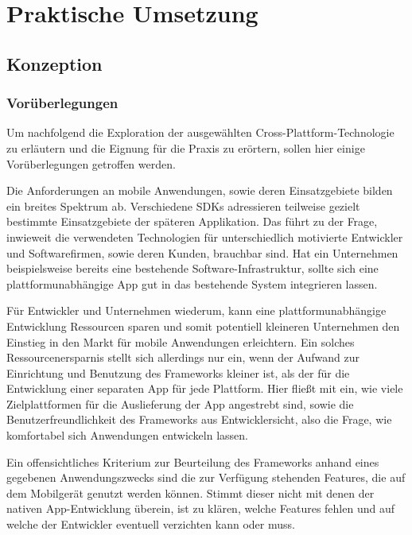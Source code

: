 \part{Praktische Umsetzung} \label{sec:praxis} 

\chapter{Konzeption}	

\section{Vorüberlegungen}	\label{sec:kriterien}
	
 	Um nachfolgend die Exploration der ausgewählten Cross-Plattform-Technologie zu erläutern und die Eignung für die Praxis zu erörtern, sollen hier einige Vorüberlegungen getroffen werden.
 	
 	Die Anforderungen an mobile Anwendungen, sowie deren Einsatzgebiete bilden ein breites Spektrum ab. Verschiedene SDKs adressieren teilweise gezielt bestimmte Einsatzgebiete der späteren Applikation. Das führt zu der Frage, inwieweit die verwendeten Technologien für unterschiedlich motivierte Entwickler und Softwarefirmen, sowie deren Kunden, brauchbar sind. Hat ein Unternehmen beispielsweise bereits eine bestehende Software-Infrastruktur, sollte sich eine plattformunabhängige App gut in das bestehende System integrieren lassen.
 	
 	Für Entwickler und Unternehmen wiederum, kann eine plattformunabhängige Entwicklung Ressourcen sparen und somit potentiell kleineren Unternehmen den Einstieg in den Markt für mobile Anwendungen erleichtern. 
 	Ein solches Ressourcenersparnis stellt sich allerdings nur ein, wenn der Aufwand zur Einrichtung und Benutzung des Frameworks kleiner ist, als der für die Entwicklung einer separaten App für jede Plattform. 
 	Hier fließt mit ein, wie viele Zielplattformen für die Auslieferung der App angestrebt sind, sowie die Benutzerfreundlichkeit des Frameworks aus Entwicklersicht, also die Frage, wie komfortabel sich Anwendungen entwickeln lassen.
 	
 	Ein offensichtliches Kriterium zur Beurteilung des Frameworks anhand eines gegebenen Anwendungszwecks sind die zur Verfügung stehenden Features, die auf dem Mobilgerät genutzt werden können. Stimmt dieser nicht mit denen der nativen App-Entwicklung überein, ist zu klären, welche Features fehlen und auf welche der Entwickler eventuell verzichten kann oder muss.
 	
